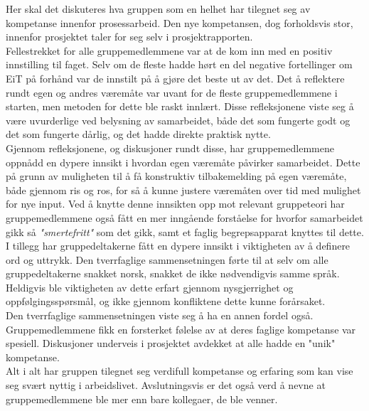 Her skal det diskuteres hva gruppen som en helhet har tilegnet seg av kompetanse innenfor prosessarbeid.
Den nye kompetansen, dog forholdsvis stor, innenfor prosjektet taler for seg selv i prosjektrapporten. \\

Fellestrekket for alle gruppemedlemmene var at de kom inn med en positiv innstilling til faget.
Selv om de fleste hadde hørt en del negative fortellinger om EiT på forhånd var de innstilt på å gjøre det beste ut av det.
Det å reflektere rundt egen og andres væremåte var uvant for de fleste gruppemedlemmene i starten, men metoden for dette ble raskt innlært.
Disse refleksjonene viste seg å være uvurderlige ved belysning av samarbeidet, både det som fungerte godt og det som fungerte dårlig, og det hadde direkte praktisk nytte. \\

Gjennom refleksjonene, og diskusjoner rundt disse, har gruppemedlemmene oppnådd en dypere innsikt i hvordan egen væremåte påvirker samarbeidet.
Dette på grunn av muligheten til å få konstruktiv tilbakemelding på egen væremåte, både gjennom ris og ros, for så å kunne justere væremåten over tid med mulighet for nye input.
Ved å knytte denne innsikten opp mot relevant gruppeteori har gruppemedlemmene også fått en mer inngående forståelse for hvorfor samarbeidet gikk så \emph{"smertefritt"} som det gikk, samt et faglig begrepsapparat knyttes til dette. \\

I tillegg har gruppedeltakerne fått en dypere innsikt i viktigheten av å definere ord og uttrykk.
Den tverrfaglige sammensetningen førte til at selv om alle gruppedeltakerne snakket norsk, snakket de ikke nødvendigvis samme språk.
Heldigvis ble viktigheten av dette erfart gjennom nysgjerrighet og oppfølgingsspørsmål, og ikke gjennom konfliktene dette kunne forårsaket. \\

Den tverrfaglige sammensetningen viste seg å ha en annen fordel også.
Gruppemedlemmene fikk en forsterket følelse av at deres faglige kompetanse var spesiell.
Diskusjoner underveis i prosjektet avdekket at alle hadde en "unik" kompetanse. \\

Alt i alt har gruppen tilegnet seg verdifull kompetanse og erfaring som kan vise seg svært nyttig i arbeidslivet.
Avslutningsvis er det også verd å nevne at gruppemedlemmene ble mer enn bare kollegaer, de ble venner. \\
